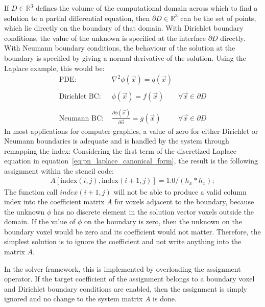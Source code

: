If $D\in\mathbb{R}^3$ defines the volume of the computational domain across which to find a solution to a partial differential equation, then $\partial D\in\mathbb{R}^3$ can be the set of points, which lie directly on the boundary of that domain. With Dirichlet boundary conditions, the value of the unknown is specified at the interface $\partial D$ directly. With Neumann boundary conditions, the behaviour of the solution at the boundary is specified by giving a normal derivative of the solution. Using the Laplace example, this would be:
\begin{align*}
\text{PDE:\ \ } & \nabla^2\phi\left(\vec{x}\right) = q\left(\vec{x}\right)
&
\\
\\
\text{Dirichlet BC:\ \ } & \phi\left(\vec{x}\right) = f\left(\vec{x}\right)
&\forall \vec{x}\in\partial D
\\
\\
\text{Neumann BC:\ \ } & \frac{\partial\phi\left(\vec{x}\right)}{\partial\vec{n}} = g\left(\vec{x}\right)
&\forall \vec{x}\in\partial D
\end{align*}
In most applications for computer graphics, a value of zero for either Dirichlet or Neumann boundaries is adequate and is handled by the system through remapping the index: Considering the first term of the discretized Laplace equation in equation~\ref{eq:pn_laplace_canonical_form}, the result is the following assignment within the stencil code:
\begin{align}
A[\mathrm{index}(i,j), \mathrm{index}(i+1, j)] = 1.0/(h_x*h_x);
\end{align}
The function call $index(i+1, j)$ will not be able to produce a valid column index into the coefficient matrix $A$ for voxels adjacent to the boundary, because the unknown $\phi$ has no discrete element in the solution vector voxels outside the domain. If the value of $\phi$ on the boundary is zero, then the unknown on the boundary voxel would be zero and its coefficient would not matter. Therefore, the simplest solution is to ignore the coefficient and not write anything into the matrix $A$.

In the solver framework, this is implemented by overloading the assignment operator. If the target coefficient of the assignment belongs to a boundary voxel and Dirichlet boundary conditions are enabled, then the assignment is simply ignored and no change to the system matrix $A$ is done.


